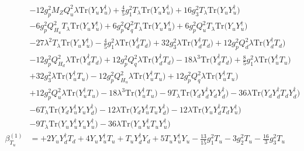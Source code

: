 \begin{align}
 &-12 g_{p}^{2} M_Z Q_{u}^{2} \lambda \mbox{Tr}\Big({Y_u  Y_{u}^{\dagger}}\Big) +\frac{4}{5} g_{1}^{2} T_{\lambda} \mbox{Tr}\Big({Y_u  Y_{u}^{\dagger}}\Big) +16 g_{3}^{2} T_{\lambda} \mbox{Tr}\Big({Y_u  Y_{u}^{\dagger}}\Big) \nonumber \\ 
 &-6 g_{p}^{2} Q_{H_u}^{2} T_{\lambda} \mbox{Tr}\Big({Y_u  Y_{u}^{\dagger}}\Big) +6 g_{p}^{2} Q_{q}^{2} T_{\lambda} \mbox{Tr}\Big({Y_u  Y_{u}^{\dagger}}\Big) +6 g_{p}^{2} Q_{u}^{2} T_{\lambda} \mbox{Tr}\Big({Y_u  Y_{u}^{\dagger}}\Big) \nonumber \\ 
 &-27 \lambda^{2} T_{\lambda} \mbox{Tr}\Big({Y_u  Y_{u}^{\dagger}}\Big) -\frac{4}{5} g_{1}^{2} \lambda \mbox{Tr}\Big({Y_{d}^{\dagger}  T_d}\Big) +32 g_{3}^{2} \lambda \mbox{Tr}\Big({Y_{d}^{\dagger}  T_d}\Big) +12 g_{p}^{2} Q_{d}^{2} \lambda \mbox{Tr}\Big({Y_{d}^{\dagger}  T_d}\Big) \nonumber \\ 
 &-12 g_{p}^{2} Q_{H_d}^{2} \lambda \mbox{Tr}\Big({Y_{d}^{\dagger}  T_d}\Big) +12 g_{p}^{2} Q_{q}^{2} \lambda \mbox{Tr}\Big({Y_{d}^{\dagger}  T_d}\Big) -18 \lambda^{3} \mbox{Tr}\Big({Y_{d}^{\dagger}  T_d}\Big) +\frac{8}{5} g_{1}^{2} \lambda \mbox{Tr}\Big({Y_{u}^{\dagger}  T_u}\Big) \nonumber \\ 
 &+32 g_{3}^{2} \lambda \mbox{Tr}\Big({Y_{u}^{\dagger}  T_u}\Big) -12 g_{p}^{2} Q_{H_u}^{2} \lambda \mbox{Tr}\Big({Y_{u}^{\dagger}  T_u}\Big) +12 g_{p}^{2} Q_{q}^{2} \lambda \mbox{Tr}\Big({Y_{u}^{\dagger}  T_u}\Big) \nonumber \\ 
 &+12 g_{p}^{2} Q_{u}^{2} \lambda \mbox{Tr}\Big({Y_{u}^{\dagger}  T_u}\Big) -18 \lambda^{3} \mbox{Tr}\Big({Y_{u}^{\dagger}  T_u}\Big) -9 T_{\lambda} \mbox{Tr}\Big({Y_d  Y_{d}^{\dagger}  Y_d  Y_{d}^{\dagger}}\Big) -36 \lambda \mbox{Tr}\Big({Y_d  Y_{d}^{\dagger}  T_d  Y_{d}^{\dagger}}\Big) \nonumber \\ 
 &-6 T_{\lambda} \mbox{Tr}\Big({Y_d  Y_{u}^{\dagger}  Y_u  Y_{d}^{\dagger}}\Big) -12 \lambda \mbox{Tr}\Big({Y_d  Y_{u}^{\dagger}  T_u  Y_{d}^{\dagger}}\Big) -12 \lambda \mbox{Tr}\Big({Y_u  Y_{d}^{\dagger}  T_d  Y_{u}^{\dagger}}\Big) \nonumber \\ 
 &-9 T_{\lambda} \mbox{Tr}\Big({Y_u  Y_{u}^{\dagger}  Y_u  Y_{u}^{\dagger}}\Big) -36 \lambda \mbox{Tr}\Big({Y_u  Y_{u}^{\dagger}  T_u  Y_{u}^{\dagger}}\Big) \\ 
\beta_{T_u}^{(1)} & =  
+2 {Y_u  Y_{d}^{\dagger}  T_d} +4 {Y_u  Y_{u}^{\dagger}  T_u} +{T_u  Y_{d}^{\dagger}  Y_d}+5 {T_u  Y_{u}^{\dagger}  Y_u} -\frac{13}{15} g_{1}^{2} T_u -3 g_{2}^{2} T_u -\frac{16}{3} g_{3}^{2} T_u \nonumber \\ 

\end{align}
